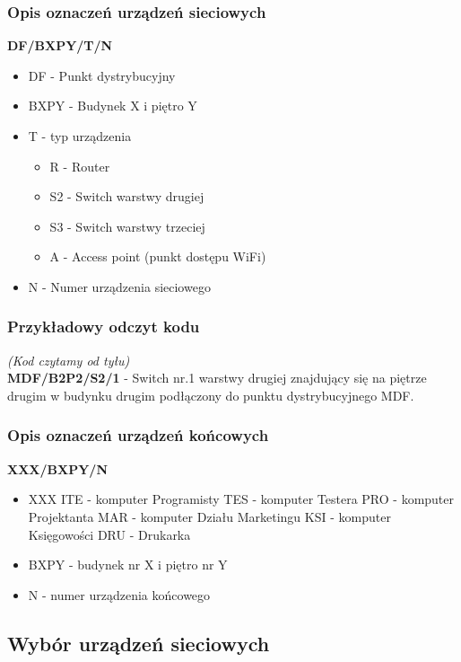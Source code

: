 \documentclass[a4paper,12pt]{extarticle}  %
\begin{document}
\subsubsection{Opis oznaczeń urządzeń sieciowych}
\textbf{DF/BXPY/T/N}
\begin{itemize}
	\item DF - Punkt dystrybucyjny
	\item BXPY - Budynek X i piętro Y
	\item T - typ urządzenia
	      \begin{itemize}
		      \item R - Router
		      \item S2 - Switch warstwy drugiej
		      \item S3 - Switch warstwy trzeciej
		      \item A - Access point (punkt dostępu WiFi)
	      \end{itemize}
	\item N - Numer urządzenia sieciowego
\end{itemize}
\subsubsection{Przykładowy odczyt kodu}
\emph{(Kod czytamy od tyłu)}\\
\textbf{MDF/B2P2/S2/1} - Switch nr.1 warstwy drugiej znajdujący się na piętrze drugim w budynku drugim podłączony do punktu dystrybucyjnego MDF.
\subsubsection{Opis oznaczeń urządzeń końcowych}
\textbf{XXX/BXPY/N}
\begin{itemize}
	\item XXX
	      \subitem ITE - komputer Programisty
	      \subitem TES - komputer Testera
	      \subitem PRO - komputer Projektanta
	      \subitem MAR - komputer Działu Marketingu
	      \subitem KSI - komputer Księgowości
	      \subitem DRU - Drukarka
	\item BXPY - budynek nr X i piętro nr Y
	\item N - numer urządzenia końcowego
\end{itemize}

\subsection{Wybór urządzeń sieciowych}
\end{document}
